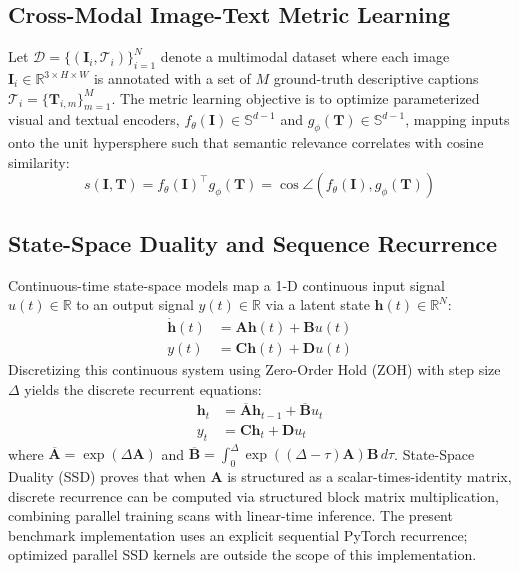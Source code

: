\documentclass[journal]{IEEEtran}
\begin{document}
\subsection{Cross-Modal Image-Text Metric Learning}
Let $\mathcal{D} = \{(\mathbf{I}_i, \mathcal{T}_i)\}_{i=1}^N$ denote a multimodal dataset where each image $\mathbf{I}_i \in \mathbb{R}^{3 \times H \times W}$ is annotated with a set of $M$ ground-truth descriptive captions $\mathcal{T}_i = \{\mathbf{T}_{i,m}\}_{m=1}^M$. The metric learning objective is to optimize parameterized visual and textual encoders, $f_{\theta}(\mathbf{I}) \in \mathbb{S}^{d-1}$ and $g_{\phi}(\mathbf{T}) \in \mathbb{S}^{d-1}$, mapping inputs onto the unit hypersphere such that semantic relevance correlates with cosine similarity:
\begin{equation}
s(\mathbf{I}, \mathbf{T}) = f_{\theta}(\mathbf{I})^\top g_{\phi}(\mathbf{T}) = \cos\angle\left(f_{\theta}(\mathbf{I}), g_{\phi}(\mathbf{T})\right)
\end{equation}

\subsection{State-Space Duality and Sequence Recurrence}
Continuous-time state-space models map a 1-D continuous input signal $u(t) \in \mathbb{R}$ to an output signal $y(t) \in \mathbb{R}$ via a latent state $\mathbf{h}(t) \in \mathbb{R}^N$:
\begin{align}
\dot{\mathbf{h}}(t) &= \mathbf{A} \mathbf{h}(t) + \mathbf{B} u(t) \\
y(t) &= \mathbf{C} \mathbf{h}(t) + \mathbf{D} u(t)
\end{align}
Discretizing this continuous system using Zero-Order Hold (ZOH) with step size $\Delta$ yields the discrete recurrent equations:
\begin{align}
\mathbf{h}_t &= \overline{\mathbf{A}} \mathbf{h}_{t-1} + \overline{\mathbf{B}} u_t \\
y_t &= \mathbf{C} \mathbf{h}_t + \mathbf{D} u_t
\end{align}
where $\overline{\mathbf{A}} = \exp(\Delta \mathbf{A})$ and $\overline{\mathbf{B}} = \int_0^\Delta \exp((\Delta - \tau)\mathbf{A})\mathbf{B}\,d\tau$. State-Space Duality (SSD) \cite{dao2024transformers} proves that when $\mathbf{A}$ is structured as a scalar-times-identity matrix, discrete recurrence can be computed via structured block matrix multiplication, combining parallel training scans with linear-time inference. The present benchmark implementation uses an explicit sequential PyTorch recurrence; optimized parallel SSD kernels are outside the scope of this implementation.
\end{document}
